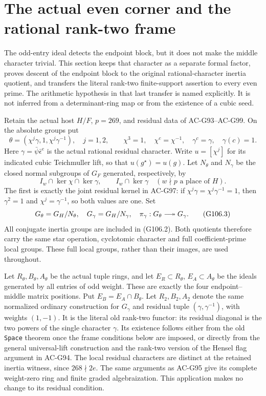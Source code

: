 \section{The actual even corner and the rational rank-two frame}
\label{sec:cubic-endpoint-transfer}

The odd-entry ideal detects the endpoint block, but it does not
make the middle character trivial.  This section keeps that character
as a separate formal factor, proves descent of the endpoint block to
the original rational-character inertia quotient, and transfers the
literal rank-two finite-support assertion to every even prime.
The arithmetic hypothesis in that last transfer is named explicitly.
It is not inferred from a determinant-ring map or from the existence
of a cubic seed.

Retain the actual host \(H/F\), \(p=269\), and residual data of
AC-G93--AC-G99.  On the absolute groups put
\[
 \theta=(\chi^j\gamma,1,\chi^j\gamma^{-1}),\quad j=1,2,
 \qquad \chi^3=1,\quad \chi^c=\chi^{-1},\quad
 \gamma^c=\gamma,\quad \gamma(c)=1.
 \tag{G106.1}
\]
Here \(\gamma=\bar\psi\bar\epsilon^e\) is the actual rational
residual character.  Write \(u=[\chi^j]\) for its indicated cubic
Teichmuller lift, so that \(u(g^\star)=u(g)\).
Let \(N_\theta\) and \(N_\gamma\) be the closed normal subgroups
of \(G_F\) generated, respectively, by
\[
 I_w\cap\ker\chi\cap\ker\gamma,
       \qquad I_w\cap\ker\gamma
       \quad(w\nmid p\text{ a place of }H).
 \tag{G106.2}
\]
The first is exactly the joint residual kernel in AC-G97:
if \(\chi^j\gamma=\chi^j\gamma^{-1}=1\), then
\(\gamma^2=1\) and \(\chi^j=\gamma^{-1}\), so both values are one.
Set
\[
 G_\theta=G_H/N_\theta,
 \quad G_\gamma=G_H/N_\gamma,
 \quad \pi_\gamma:G_\theta\longtwoheadrightarrow G_\gamma.
 \tag{G106.3}
\]
All conjugate inertia groups are included in (G106.2).
Both quotients therefore carry the same star operation, cyclotomic
character and full coefficient-prime local groups.  These full
local groups, rather than their images, are used throughout.

Let \(R_\theta,B_\theta,A_\theta\) be the actual tuple rings,
and let \(E_R\subset R_\theta\), \(E_A\subset A_\theta\) be the
ideals generated by all entries of odd weight.  These are exactly
the four endpoint--middle matrix positions.  Put
\(E_B=E_A\cap B_\theta\).
Let \(R_2,B_2,A_2\) denote the same normalized ordinary construction
for \(G_\gamma\) and residual tuple \((\gamma,\gamma^{-1})\),
with weights \((1,-1)\).  It is the literal old rank-two functor:
its residual diagonal is the two powers of the single character
\(\gamma\).  Its existence follows either from the old
\texttt{Space} theorem once the frame conditions below are imposed,
or directly from the general universal-lift construction and the
rank-two version of the Hensel flag argument in AC-G94.
The local residual characters are distinct at the retained inertia
witness, since \(268\nmid2e\).
The same arguments as AC-G95 give its complete weight-zero ring and
finite graded algebraization.  This application makes no change to
its residual condition.

